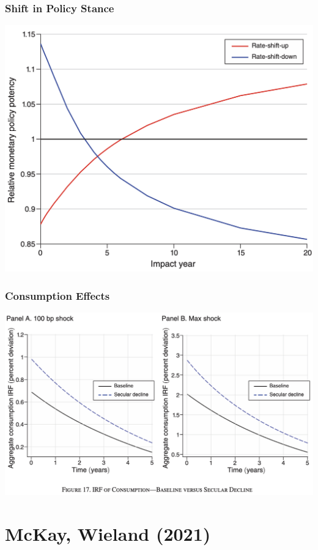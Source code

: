 \documentclass[english,xcolor=svgnames]{beamer}
\begin{document}
\begin{frame}
    \frametitle{Shift in Policy Stance}
    \begin{center}
    	\includegraphics[scale=0.3]{figures/BMTVFIG14.png}	
    \end{center}
\end{frame}

\begin{frame}
    \frametitle{Consumption Effects}
    \begin{center}
    	\includegraphics[scale=0.3]{figures/BMTVFIG17.png}	
    \end{center}
\end{frame}


\section{McKay, Wieland (2021)}
\end{document}
